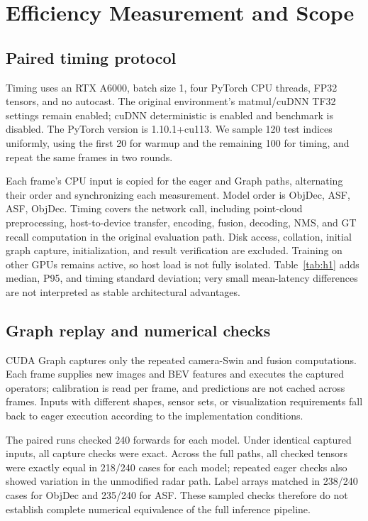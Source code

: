 \section{Efficiency Measurement and Scope}
\label{app:h}

\subsection{Paired timing protocol}
\label{subsec:h1}

Timing uses an RTX A6000, batch size 1, four PyTorch CPU threads, FP32 tensors, and no autocast. The original environment's matmul/cuDNN TF32 settings remain enabled; cuDNN deterministic is enabled and benchmark is disabled. The PyTorch version is 1.10.1+cu113. We sample 120 test indices uniformly, using the first 20 for warmup and the remaining 100 for timing, and repeat the same frames in two rounds.

Each frame's CPU input is copied for the eager and Graph paths, alternating their order and synchronizing each measurement. Model order is ObjDec, ASF, ASF, ObjDec. Timing covers the network call, including point-cloud preprocessing, host-to-device transfer, encoding, fusion, decoding, NMS, and GT recall computation in the original evaluation path. Disk access, collation, initial graph capture, initialization, and result verification are excluded. Training on other GPUs remains active, so host load is not fully isolated. Table~\ref{tab:h1} adds median, P95, and timing standard deviation; very small mean-latency differences are not interpreted as stable architectural advantages.

\subsection{Graph replay and numerical checks}
\label{subsec:h2}

CUDA Graph captures only the repeated camera-Swin and fusion computations. Each frame supplies new images and BEV features and executes the captured operators; calibration is read per frame, and predictions are not cached across frames. Inputs with different shapes, sensor sets, or visualization requirements fall back to eager execution according to the implementation conditions.

The paired runs checked 240 forwards for each model. Under identical captured inputs, all capture checks were exact. Across the full paths, all checked tensors were exactly equal in 218/240 cases for each model; repeated eager checks also showed variation in the unmodified radar path. Label arrays matched in 238/240 cases for ObjDec and 235/240 for ASF. These sampled checks therefore do not establish complete numerical equivalence of the full inference pipeline.

